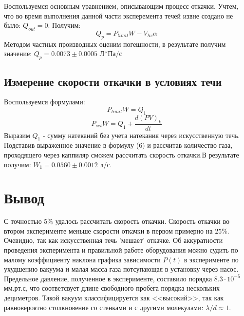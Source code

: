 \documentclass[a4paper, 12pt]{article}%
\begin{document}
Воспользуемся основным уравнением, описывающим процесс откачки. Учтем, что во время выполнения данной части эксперемента течей извне создано не было: $Q_{out} = 0$. Получим:
\begin{equation}
    Q_{p} = P_{limit}W - V_{hv} \alpha
\end{equation}
Методом частных производных оценим погешности, в результате получим значение:
$Q_{p} = 0.0073 \pm 0.0005$ Л*Па/с
\subsection{Измерение скорости откачки в условиях течи}


Воспользуемся формулами:
\begin{equation}
    P_{limit} W = Q_{1} 
\end{equation}
\begin{equation}
    P_{set} W = Q_{1}+\frac{d (P V)_{k}}{d t}
\end{equation}
Выразим $Q_{1}$ - сумму натеканий без учета натекания через искусственную течь. Подставив выраженное значение в формулу (6) и рассчитав количество газа, проходящего через каппиляр сможем рассчитать скорость откачки.В результате получим: $W_{1} = 0.0560 \pm 0.0012$ л/с. 
\section{Вывод}
С точностью $5 \%$ удалось рассчитать скорость откачки. Скорость откачки во втором эксперименте меньше скорости откачки в первом примерно на $25 \%$. Очевидно, так как искусственная течь 'мешает' откачке. Об аккуратности проведения эксперимента и правильной работе оборудования можно судить по малому коэффициенту наклона графика зависимости $P(t)$ в эксперименте по ухудшению вакуума и малая масса газа потсупающая в установку через насос. Предельное давление, полученное в эксперименте, составило порядка $8.3 \cdot 10^{-5}$ мм.рт.с, что соответсвует длине свободного пробега порядка нескольких дециметров. Такой вакуум классифицируется как <<высокий>>, так как равновероятно столкновение со стенками и с другими молекулами: $\lambda/d \approx 1$.
\end{document}
